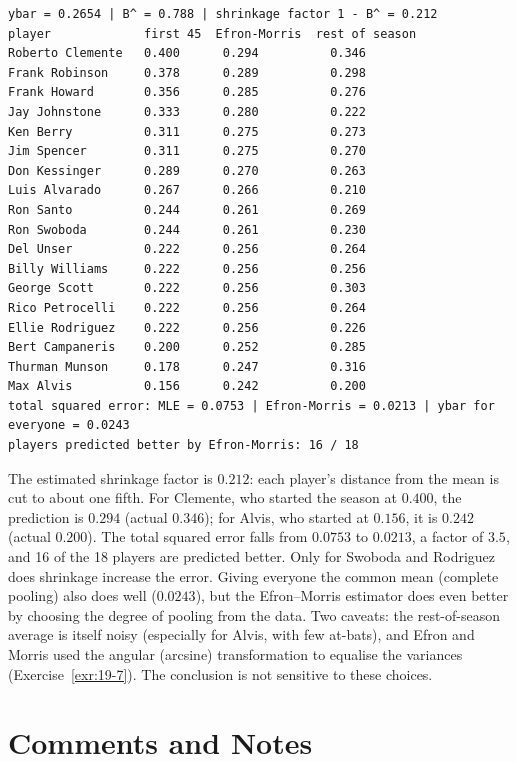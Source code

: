 \documentclass[main.tex]{subfiles}
\begin{document}
\begin{lstlisting}[style=output]
ybar = 0.2654 | B^ = 0.788 | shrinkage factor 1 - B^ = 0.212
player             first 45  Efron-Morris  rest of season
Roberto Clemente   0.400      0.294          0.346
Frank Robinson     0.378      0.289          0.298
Frank Howard       0.356      0.285          0.276
Jay Johnstone      0.333      0.280          0.222
Ken Berry          0.311      0.275          0.273
Jim Spencer        0.311      0.275          0.270
Don Kessinger      0.289      0.270          0.263
Luis Alvarado      0.267      0.266          0.210
Ron Santo          0.244      0.261          0.269
Ron Swoboda        0.244      0.261          0.230
Del Unser          0.222      0.256          0.264
Billy Williams     0.222      0.256          0.256
George Scott       0.222      0.256          0.303
Rico Petrocelli    0.222      0.256          0.264
Ellie Rodriguez    0.222      0.256          0.226
Bert Campaneris    0.200      0.252          0.285
Thurman Munson     0.178      0.247          0.316
Max Alvis          0.156      0.242          0.200
total squared error: MLE = 0.0753 | Efron-Morris = 0.0213 | ybar for everyone = 0.0243
players predicted better by Efron-Morris: 16 / 18
\end{lstlisting}

The estimated shrinkage factor is $0.212$: each player's distance from the mean is cut to about one fifth. For Clemente, who started the season at $0.400$, the prediction is $0.294$ (actual $0.346$); for Alvis, who started at $0.156$, it is $0.242$ (actual $0.200$). The total squared error falls from $0.0753$ to $0.0213$, a factor of $3.5$, and 16 of the 18 players are predicted better. Only for Swoboda and Rodriguez does shrinkage increase the error. Giving everyone the common mean (complete pooling) also does well ($0.0243$), but the Efron--Morris estimator does even better by choosing the degree of pooling from the data. Two caveats: the rest-of-season average is itself noisy (especially for Alvis, with few at-bats), and Efron and Morris used the angular (arcsine) transformation to equalise the variances (Exercise~\ref{exr:19-7}). The conclusion is not sensitive to these choices.

\section{Comments and Notes}
\end{document}
